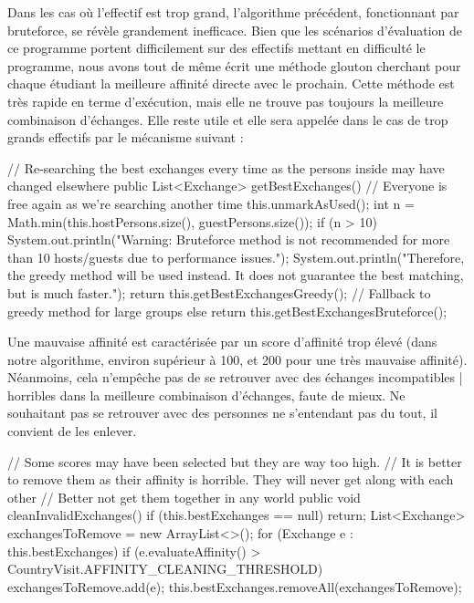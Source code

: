 \documentclass{mytex}
\begin{document}

Dans les cas où l'effectif est trop grand, l'algorithme précédent, fonctionnant par bruteforce, se révèle grandement inefficace. Bien que les scénarios d'évaluation de ce programme portent difficilement sur des effectifs mettant en difficulté le programme, nous avons tout de même écrit une méthode glouton cherchant pour chaque étudiant la meilleure affinité directe avec le prochain. Cette méthode est très rapide en terme d'exécution, mais elle ne trouve pas toujours la meilleure combinaison d'échanges. Elle reste utile et elle sera appelée dans le cas de trop grands effectifs par le mécanisme suivant :

\begin{codebox}
// Re-searching the best exchanges every time as the persons inside may have changed elsewhere
public List<Exchange> getBestExchanges() {
	// Everyone is free again as we're searching another time
	this.unmarkAsUsed();
	int n = Math.min(this.hostPersons.size(), guestPersons.size());
	if (n > 10) {
		System.out.println("Warning: Bruteforce method is not recommended for more than 10 hosts/guests due to performance issues.");
		System.out.println("Therefore, the greedy method will be used instead. It does not guarantee the best matching, but is much faster.");
		return this.getBestExchangesGreedy(); // Fallback to greedy method for large groups
	} else {
		return this.getBestExchangesBruteforce();
	}
}
\end{codebox}




Une mauvaise affinité est caractérisée par un score d'affinité trop élevé (dans notre algorithme, environ supérieur à 100, et 200 pour une très mauvaise affinité). Néanmoins, cela n'empêche pas de se retrouver avec des échanges incompatibles | horribles dans la meilleure combinaison d'échanges, faute de mieux. Ne souhaitant pas se retrouver avec des personnes ne s'entendant pas du tout, il convient de les enlever.

\begin{codebox}
// Some scores may have been selected but they are way too high.
// It is better to remove them as their affinity is horrible. They will never get along with each other
// Better not get them together in any world
public void cleanInvalidExchanges() {
	if (this.bestExchanges == null) return;
	List<Exchange> exchangesToRemove = new ArrayList<>();
	for (Exchange e : this.bestExchanges) {
		if (e.evaluateAffinity() > CountryVisit.AFFINITY_CLEANING_THRESHOLD) {
			exchangesToRemove.add(e);
		}
	}
	this.bestExchanges.removeAll(exchangesToRemove);
}
\end{codebox}
\end{document}
